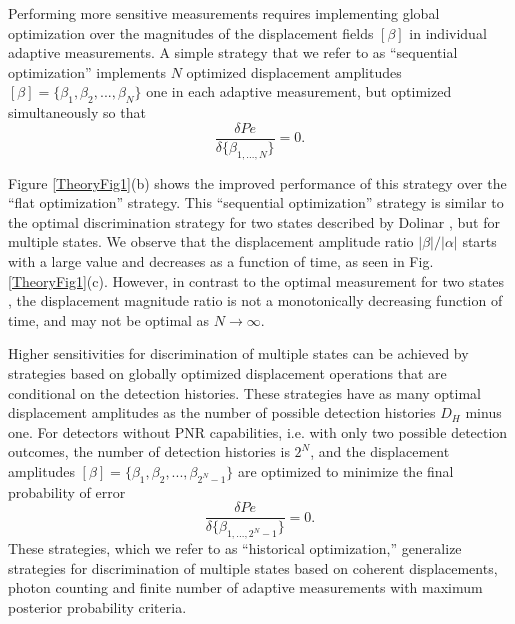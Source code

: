 \documentclass[twocolumn,pra,preprintnumbers,amsmath,amssymb,superscriptaddress,floatfix]{revtex4}%
\begin{document}
Performing more sensitive measurements requires implementing global
optimization over the magnitudes of the displacement fields
$[\beta]$ in individual adaptive measurements. A simple strategy
that we refer to as ``sequential optimization'' implements $N$
optimized displacement amplitudes
$[\beta]=\{\beta_{1},\beta_{2},...,\beta_{N}\}$ one in each adaptive
measurement, but optimized simultaneously so that
\begin{equation}\label{PeSeq}
\frac{\delta Pe}{\delta\{\beta_{1,...,N}\}}=0.
\end{equation}

Figure \ref{TheoryFig1}(b) shows the improved performance of this strategy
over the ``flat optimization'' strategy. This ``sequential
optimization'' strategy is similar to the optimal discrimination
strategy for two states described by Dolinar \cite{dolinar73}, but
for multiple states. We observe that the displacement amplitude
ratio $|\beta|/|\alpha|$ starts with a large value and decreases as a
function of time, as seen in Fig. \ref{TheoryFig1}(c). However, in
contrast to the optimal measurement for two states \cite{dolinar73},
the displacement magnitude ratio is not a monotonically decreasing
function of time, and may not be optimal as
$N\rightarrow\infty$.

Higher sensitivities for discrimination of multiple states can be
achieved by strategies based on globally optimized displacement
operations that are conditional on the detection histories. These
strategies have as many optimal displacement amplitudes as the
number of possible detection histories $D_{H}$ minus one.
For detectors without PNR capabilities, i.e. with only two possible
detection outcomes, the number of detection histories is $2^N$, and
the displacement amplitudes
$[\beta]=\{\beta_{1},\beta_{2},...,\beta_{2^{N}-1}\}$ are optimized to minimize
the final probability of error
\begin{equation}\label{PeHist}
\frac{\delta Pe}{\delta\{\beta_{1,...,2^N-1}\}}=0.
\end{equation}
These strategies, which we refer to as ``historical optimization,''
generalize strategies for discrimination of multiple states based on
coherent displacements, photon counting and finite number of
adaptive measurements with maximum posterior probability criteria.
\end{document}
